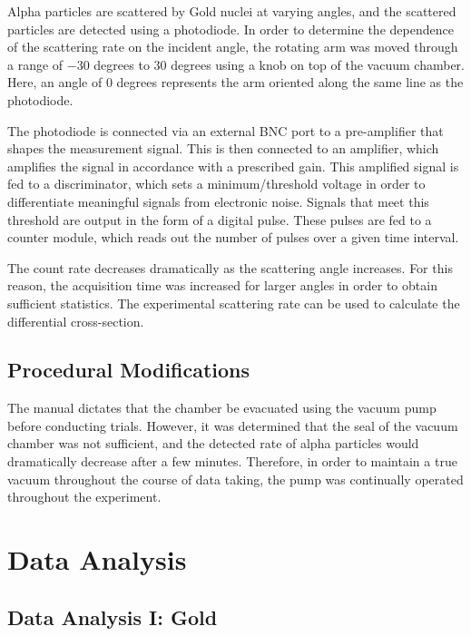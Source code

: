 \documentclass[a4paper]{article}
\begin{document}
\qq Alpha particles are scattered by Gold nuclei at varying angles, and the scattered particles are detected using a photodiode. In order to determine the dependence of the scattering rate on the incident angle, the rotating arm was moved through a range of $-30$ degrees to $30$ degrees using a knob on top of the vacuum chamber. Here, an angle of 0 degrees represents the arm oriented along the same line as the photodiode.

\qq The photodiode is connected via an external BNC port to a pre-amplifier that shapes the measurement signal. This is then connected to an amplifier, which amplifies the signal in accordance with a prescribed gain. This amplified signal is fed to a discriminator, which sets a minimum/threshold voltage in order to differentiate meaningful signals from electronic noise. Signals that meet this threshold are output in the form of a digital pulse. These pulses are fed to a counter module, which reads out the number of pulses over a given time interval.

The count rate decreases dramatically as the scattering angle increases. For this reason, the acquisition time was increased for larger angles in order to obtain sufficient statistics. The experimental scattering rate can be used to calculate the differential cross-section.

\subsection{Procedural Modifications}
\qq The manual dictates that the chamber be evacuated using the vacuum pump before conducting trials. However, it was determined that the seal of the vacuum chamber was not sufficient, and the detected rate of alpha particles would dramatically decrease after a few minutes. Therefore, in order to maintain a true vacuum throughout the course of data taking, the pump was continually operated throughout the experiment.
\qq 

\section{Data Analysis}

\subsection{Data Analysis I: Gold}
\end{document}
